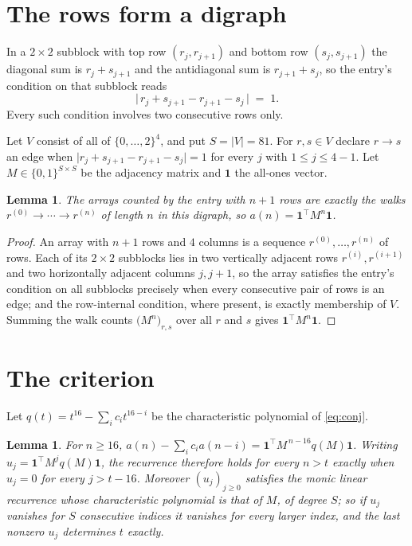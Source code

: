\documentclass[11pt,a4paper]{article}
\theoremstyle{plain}
\newtheorem{lemma}[theorem]{Lemma}
\theoremstyle{definition}
\begin{document}
\section{The rows form a digraph}

In a $2\times2$ subblock with top row $(r_j,r_{j+1})$ and bottom row $(s_j,s_{j+1})$ the
diagonal sum is $r_j+s_{j+1}$ and the antidiagonal sum is $r_{j+1}+s_j$, so the entry's
condition on that subblock reads
\[
\bigl|\,r_j+s_{j+1}-r_{j+1}-s_j\,\bigr|\;=\;1.
\]
Every such condition involves two consecutive rows only.

Let $V$ consist of all of $\{0,\dots,2\}^{4}$, and put $S=|V|=81$. For $r,s\in V$ declare $r\to s$ an edge
when $\bigl|r_j+s_{j+1}-r_{j+1}-s_j\bigr|=1$ for every $j$ with
$1\le j\le4-1$. Let $M\in\{0,1\}^{S\times S}$ be the adjacency matrix and $\mathbf{1}$
the all-ones vector.

\begin{lemma}\label{lem:walk}
The arrays counted by the entry with $n+1$ rows are exactly the walks
$r^{(0)}\to\cdots\to r^{(n)}$ of length $n$ in this digraph, so
$a(n)=\mathbf{1}^{\!\top}M^{n}\mathbf{1}$.
\end{lemma}

\begin{proof}
An array with $n+1$ rows and $4$ columns is a sequence $r^{(0)},\dots,r^{(n)}$ of
rows. Each of its $2\times2$ subblocks lies in two vertically adjacent rows
$r^{(i)},r^{(i+1)}$ and two horizontally adjacent columns $j,j+1$, so the array satisfies
the entry's condition on all subblocks precisely when every consecutive pair of rows is an
edge; and the row-internal condition, where present, is exactly membership of $V$. Summing
the walk counts $\bigl(M^{n}\bigr)_{r,s}$ over all $r$ and $s$ gives
$\mathbf{1}^{\!\top}M^{n}\mathbf{1}$.
\end{proof}

\section{The criterion}

Let $q(t)=t^{16}-\sum_i c_i t^{16-i}$ be the characteristic polynomial of
\eqref{eq:conj}.

\begin{lemma}\label{lem:crit}
For $n\ge16$,
$a(n)-\sum_i c_i a(n-i)=\mathbf{1}^{\!\top}M^{\,n-16}q(M)\mathbf{1}$. Writing
$u_j=\mathbf{1}^{\!\top}M^{j}q(M)\mathbf{1}$, the recurrence therefore holds for every
$n>t$ exactly when $u_j=0$ for every $j>t-16$. Moreover $(u_j)_{j\ge0}$ satisfies the
monic linear recurrence whose characteristic polynomial is that of $M$, of degree $S$; so
if $u_j$ vanishes for $S$ consecutive indices it vanishes for every larger index, and the
last nonzero $u_j$ determines $t$ exactly.
\end{lemma}
\end{document}
